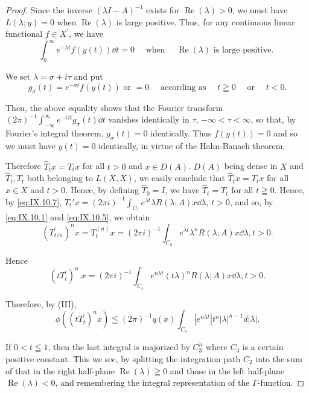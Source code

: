 \begin{proof}
Since the inverse $(\lambda I - A)^{-1}$ exists for $\operatorname{Re}(\lambda) > 0$, we must have $L(\lambda; y) = 0$ when $\operatorname{Re}(\lambda)$ is large positive. Thus, for any continuous linear functional 
$f\in X^{\prime}$, we have 
\[
\int_{0} ^{\infty} e ^{- \lambda t} f (y (t)) \dd t = 0 \quad \text{ when } \quad \operatorname{Re} (\lambda) \text{ is large positive. }
\]

We set $\lambda = \sigma + i\tau$ and put 
\[
g _{\sigma} (t) = e ^{- \sigma t} f (y (t)) \text{ or } = 0 \quad \text{ according as } \quad t \geqq 0 \quad \text{ or } \quad t < 0.
\]

Then, the above equality shows that the Fourier transform $(2\pi)^{-1}\int_{-\infty}^{\infty}e^{-i\tau t}g_{\sigma}(t)\dd t$ vanishes identically in $\tau$, $-\infty < \tau < \infty$, so that, by Fourier's integral theorem, $g_{\sigma}(t) = 0$ identically. Thus $f(y(t)) = 0$ and so we must have $y(t) = 0$ identically, in virtue of the Hahn-Banach theorem. 

Therefore $\hat{T}_t x = T_t x$ for all $t > 0$ and $x \in D(A)$. $D(A)$ being dense in $X$ and $\hat{T}_t, T_t$ both belonging to $L(X, X)$, we easily conclude that $\hat{T}_t x = T_t x$ for all $x \in X$ and $t > 0$. Hence, by defining $\hat{T}_0 = I$, we have $\hat{T}_t = T_t$ for all $t \geqq 0$. Hence, by \eqref{eq:IX.10.7}, $T_t' x = (2\pi i)^{-1} \int_{C_1} e^{\lambda t} \lambda R(\lambda; A) x \dd\lambda$, $t > 0$, and so, by \eqref{eq:IX.10.1} and \eqref{eq:IX.10.5}, we obtain 
\[
(T _{t/n} ^{\prime}) ^{n} x = T _{t} ^{(n)} x = (2 \pi i) ^{-1} \int_ {C _{3}} e ^{\lambda t} \lambda^{n} R (\lambda ; A) x \dd \lambda , t > 0.
\]

Hence 
\[
(t T _{t} ^{\prime}) ^{n}. x = (2 \pi i) ^{-1} \int_ {C _{s}} e ^{n \lambda t} (t \lambda) ^{n} R (\lambda ; A) x \dd \lambda , t > 0.
\]

Therefore, by (III), 
\[
\phi \left((t T _{t} ^{\prime}) ^{n} x\right) \leqq (2 \pi) ^{-1} q (x) \int_ {C _{s}} | e ^{n \lambda t} | t ^{n} | \lambda | ^{n-1} d | \lambda |.
\]

If $0 < t \leqq 1$, then the last integral is majorized by $C_{3}^{n}$ where $C_{3}$ is a certain positive constant. This we see, by splitting the integration path $C_{2}$ into the sum of that in the right half-plane $\operatorname{Re}(\lambda) \geqq 0$ and those in the left half-plane $\operatorname{Re}(\lambda) < 0$, and remembering the integral representation of the $\Gamma$-function.
\end{proof}

